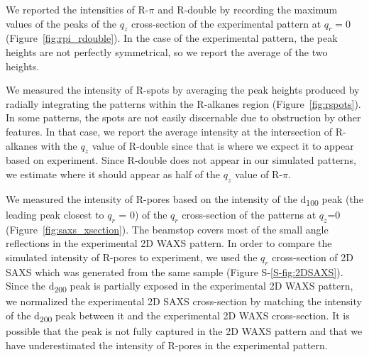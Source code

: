 \documentclass[journal=jpcbfk,manuscript=article]{achemso}
\begin{document}

  We reported the intensities of R-$\pi$ and R-double by recording the maximum values
  of the peaks of the $q_z$ cross-section of the experimental pattern at $q_r=0$ 
  (Figure~\ref{fig:rpi_rdouble}). In the case of the experimental pattern, the peak
  heights are not perfectly symmetrical, so we report the average of the two heights.

  We measured the intensity of R-spots by averaging the peak heights produced
  by radially integrating the patterns within the R-alkanes region
  (Figure~\ref{fig:rspots}). In some patterns, the spots are not easily
  discernable due to obstruction by other features. In that case, we report the
  average intensity at the intersection of R-alkanes with the $q_z$ value of
  R-double since that is where we expect it to appear based on experiment. Since
  R-double does not appear in our simulated patterns, we estimate where it should
  appear as half of the $q_z$ value of R-$\pi$.


  We measured the intensity of R-pores based on the intensity of the
  d\textsubscript{100} peak (the leading peak closest to $q_r$ = 0) of the $q_r$
  cross-section of the patterns at $q_z$=0 (Figure~\ref{fig:saxs_xsection}). The
  beamstop covers most of the small angle reflections in the experimental 2D WAXS
  pattern. In order to compare the simulated intensity of R-pores to experiment,
  we used the $q_r$ cross-section of 2D SAXS which was generated from the same
  sample (Figure S-\ref{S-fig:2DSAXS}). Since the d\textsubscript{200} peak is
  partially exposed in the experimental 2D WAXS pattern, we normalized the
  experimental 2D SAXS cross-section by matching the intensity of the
  d\textsubscript{200} peak between it and the experimental 2D WAXS
  cross-section. It is possible that the peak is not fully captured in the 2D
  WAXS pattern and that we have underestimated the intensity of R-pores in the
  experimental pattern.     
\end{document}
